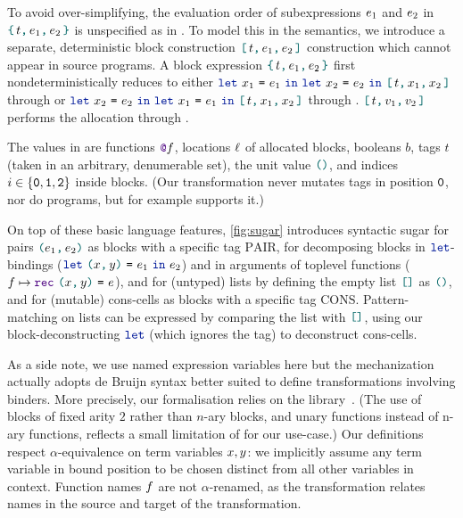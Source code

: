 To avoid over-simplifying, the evaluation order of subexpressions $\datalangExpr_1$ and $\datalangExpr_2$ in $\datalangBlock{\datalangTag}{\datalangExpr_1}{\datalangExpr_2}$ is unspecified as in \OCaml.
To model this in the semantics, we introduce a separate, deterministic block construction $\datalangBlockDet{\datalangTag}{\datalangExpr_1}{\datalangExpr_2}$ construction which cannot appear in source programs. A block expression $\datalangBlock{\datalangTag}{\datalangExpr_1}{\datalangExpr_2}$ first nondeterministically reduces to either $\datalangLet{\datalangVar_1}{\datalangExpr_1}{\datalangLet{\datalangVar_2}{\datalangExpr_2}{\datalangBlockDet{\datalangTag}{\datalangVar_1}{\datalangVar_2}}}$ through  or $\datalangLet{\datalangVar_2}{\datalangExpr_2}{\datalangLet{\datalangVar_1}{\datalangExpr_1}{\datalangBlockDet{\datalangTag}{\datalangVar_1}{\datalangVar_2}}}$ through . $\datalangBlockDet{\datalangTag}{\datalangVal_1}{\datalangVal_2}$ performs the allocation through .

The values in \DataLang are functions $\datalangFnptr{\datalangFn}$, locations $\datalangLoc$ of allocated blocks, booleans $b$, tags $t$ (taken in an arbitrary, denumerable set), the unit value $\datalangUnit$, and indices $i \in \{\texttt{0}, \texttt{1}, \texttt{2}\}$ inside blocks. (Our transformation never mutates tags in position $\texttt{0}$, nor do \OCaml programs, but for example \Mezzo supports it.)

On top of these basic language features, \cref{fig:sugar} introduces syntactic sugar for pairs $\datalangPair {\datalangExpr_1} {\datalangExpr_2}$ as blocks with a specific tag $\mathrm{PAIR}$, for decomposing blocks in $\term{\color{datalangKeyword1}{let}}$-bindings ($\datalangLet {\datalangPair \datalangVar \datalangVarTwo} {\datalangExpr_1} {\datalangExpr_2}$) and in arguments of toplevel functions ($\datalangFn \mapsto \datalangRec {\datalangPair \datalangVar \datalangVarTwo} \datalangExpr$), and for (untyped) lists by defining the empty list $\datalangNil$ as $\datalangUnit$, and for (mutable) cons-cells as blocks with a specific tag $\mathrm{CONS}$. Pattern-matching on lists can be expressed by comparing the list with $\datalangNil$, using our block-deconstructing $\term{\color{datalangKeyword1}{let}}$ (which ignores the tag) to deconstruct cons-cells.

As a side note, we use named expression variables here but the \Coq mechanization actually adopts de Bruijn syntax better suited to define transformations involving binders.
More precisely, our formalisation relies on the \Autosubst library~\cite{DBLP:conf/itp/SchaferTS15}. (The use of blocks of fixed arity $2$ rather than $n$-ary blocks, and unary functions instead of n-ary functions, reflects a small limitation of \Autosubst for our use-case.) Our definitions respect $\alpha$-equivalence on term variables $\datalangVar, \datalangVarTwo$: we implicitly assume any term variable in bound position to be chosen distinct from all other variables in context. Function names $\datalangFn$ are not $\alpha$-renamed, as the transformation relates names in the source and target of the transformation.

